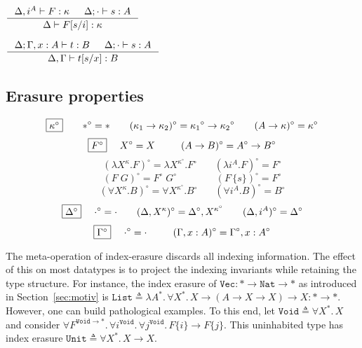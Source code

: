 \begin{lemma}\label{lem:ixsubst}
$ \inference{\Delta,i^A |- F:\kappa & \Delta;\cdot |- s:A}
	{\Delta |- F[s/i]:\kappa} $
\end{lemma}

\begin{lemma}\label{lem:tmsubst}
$ \inference{\Delta;\Gamma,x:A |- t:B & \Delta;\cdot |- s:A}
	{\Delta,\Gamma |- t[s/x]:B} $
\end{lemma}

\subsection{Erasure properties}
\label{ssec:erasure}
\begin{definition}\label{def:ierase}
\[ \fbox{$\kappa^\circ$}
 ~~~~ ~~
 *^\circ =
 *
 ~~~~ ~~
 (\kappa_1 -> \kappa_2)^\circ =
 {\kappa_1}^\circ -> {\kappa_2}^\circ
 ~~~~ ~~
 (A -> \kappa)^\circ =
 \kappa^\circ
\]
\[ \fbox{$F^\circ$}
 ~~~~
 X^\circ =
 X
 ~~~~ ~~~~
 (A -> B)^\circ =
 A^\circ -> B^\circ
\]
\[ \qquad
 (\lambda X^\kappa.F)^\circ =
 \lambda X^{\kappa^\circ}.F^\circ
 ~~~~ ~~~~
 (\lambda i^A.F)^\circ =
 F^\circ
\]
\[ \qquad
 (F\;G)^\circ =
 F^\circ\;G^\circ
 ~~~~ ~~~~ ~~~~ ~~~~ ~~
 (F\,\{s\})^\circ =
 F^\circ
\]
\[ \qquad
 (\forall X^\kappa . B)^\circ =
 \forall X^{\kappa^\circ} . B^\circ
 ~~~~ ~~~~
 (\forall i^A . B)^\circ =
 B^\circ
\]
\[ \fbox{$\Delta^\circ$}
 ~~~~
 \cdot^\circ = \cdot
 ~~~~ ~~
 (\Delta,X^\kappa)^\circ = \Delta^\circ,X^{\kappa^\circ}
 ~~~~ ~~
 (\Delta,i^A)^\circ = \Delta^\circ
\]
\[ \fbox{$\Gamma^\circ$}
 ~~~~
 \cdot^\circ = \cdot
 ~~~~ ~~~~
 (\Gamma,x:A)^\circ = \Gamma^\circ,x:A^\circ
\]
\end{definition}

\begin{example}
The meta-operation of index-erasure discards all indexing information.
The effect of this on most datatypes is to project the indexing invariants
while retaining the type structure.  For instance, the index erasure of
$\mathtt{Vec}: \mathtt * \to \mathtt{Nat} \to \mathtt*$ as introduced in
Section~\ref{sec:motiv} is $\mathtt{List} \triangleq \lambda
A^\mathtt*.\,\forall X^\mathtt*.\, X \to (A\to X\to X)\to X:
\mathtt*\to\mathtt*$.
%
However, one can build pathological examples.  To this end, let
$\mathtt{Void}
\triangleq \forall X^\mathtt{*}.\,X$ and consider %
$\forall F^{\mathtt{Void}\to *}.\,\forall i^\mathtt{Void}.\,\forall
j^\mathtt{Void}.\, F\{i\}\to F\{j\}$.  This uninhabited type has index
erasure $\mathtt{Unit} \triangleq \forall X^\mathtt{*}.\,X\to X$.
\end{example}


